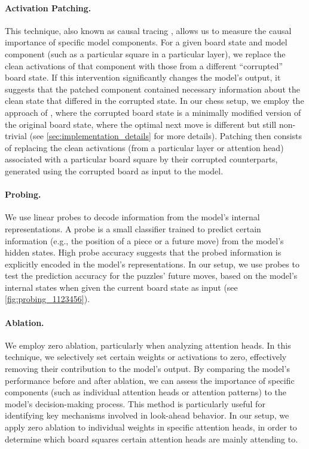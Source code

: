 \documentclass{article}
\begin{document}
\paragraph{Activation Patching.} This technique, also known as causal tracing \citep{meng2023locating}, allows us to measure the causal importance of specific model components. For a given board state and model component (such as a particular square in a particular layer), we replace the clean activations of that component with those from a different ``corrupted'' board state. If this intervention significantly changes the model's output, it suggests that the patched component contained necessary information about the clean state that differed in the corrupted state. In our chess setup, we employ the approach of \citet{jenner2024evidence}, where the corrupted board state is a minimally modified version of the original board state, where the optimal next move is different but still non-trivial (see \cref{sec:implementation_details} for more details). Patching then consists of replacing the clean activations (from a particular layer or attention head) associated with a particular board square by their corrupted counterparts, generated using the corrupted board as input to the model.

\paragraph{Probing.} We use linear probes to decode information from the model's internal representations. A probe is a small classifier trained to predict certain information (e.g., the position of a piece or a future move) from the model's hidden states. High probe accuracy suggests that the probed information is explicitly encoded in the model's representations. In our setup, we use probes to test the prediction accuracy for the puzzles' future moves, based on the model's internal states when given the current board state as input (see \cref{fig:probing_1123456}).

\paragraph{Ablation.} We employ zero ablation, particularly when analyzing attention heads. In this technique, we selectively set certain weights or activations to zero, effectively removing their contribution to the model's output. By comparing the model's performance before and after ablation, we can assess the importance of specific components (such as individual attention heads or attention patterns) to the model's decision-making process. This method is particularly useful for identifying key mechanisms involved in look-ahead behavior. In our setup, we apply zero ablation to individual weights in specific attention heads, in order to determine which board squares certain attention heads are mainly attending to.
\end{document}

